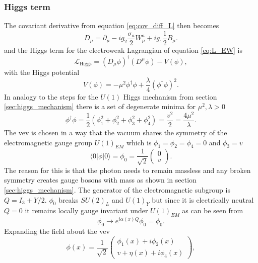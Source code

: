 \subsubsection*{Higgs term}
The covariant derivative from equation \ref{eq:cov_diff_L} then becomes
\begin{equation}
    D_\mu=\partial_\mu- i g_2\frac{{\sigma}_a}{2}W_\mu^a+ ig_1\frac{1}{2}B_\mu.
\end{equation}
and the Higgs term for the electroweak Lagrangian of equation \ref{eq:L_EW} is
\begin{equation}
    \mathcal{L}_\text{Higgs}= \left(D_\mu\phi\right)^\dagger (D^\mu\phi)-V(\phi),
    \label{eq:L_higgs}
\end{equation}
with the Higgs potential
\begin{equation}
    V(\phi) = -\mu^2\phi^\dagger\phi+\frac{\lambda}{4}\left(\phi^\dagger\phi\right)^2.
    \label{eq:Higgs_initial_potential}
\end{equation}
In analogy to the steps for the $U(1)$ Higgs mechanism from section \ref{sec:higgs_mechanism} there is a set of degenerate minima for $\mu^2,\lambda>0$
\begin{equation}
    \phi^\dagger\phi=\frac{1}{2}(\phi_1^2+\phi_2^2+\phi_3^2+\phi_4^2)=\frac{v^2}{2}=\frac{4\mu^2}{\lambda}.
    \label{eq:higgs_vev}
\end{equation}
The \ac{vev} is chosen in a way that the vacuum shares the symmetry of the electromagnetic gauge group $U(1)_{EM}$ which is \mbox{$\phi_1=\phi_2=\phi_4=0$} and $\phi_3=v$
\begin{equation}
    \langle0\vert \phi \vert0\rangle=\phi_0=\frac{1}{\sqrt{2}}
    \begin{pmatrix}
        0 \\
        v
    \end{pmatrix}.
\end{equation}
The reason for this is that the photon needs to remain massless and any broken symmetry creates gauge bosons with mass as shown in section \ref{sec:higgs_mechanism}. The generator of the electromagnetic subgroup is $Q=I_3+Y/2$. $\phi_0$ breaks $SU(2)_L$ and $U(1)_Y$ but since it is electrically neutral $Q=0$ it remains locally gauge invariant under $U(1)_{EM}$ as can be seen from
\begin{equation}
    \phi_0 \rightarrow e^{i\alpha(x)Q}\phi_0=\phi_0.
\end{equation}
Expanding the field about the \ac{vev}
\begin{equation}
    \phi(x)=\frac{1}{\sqrt{2}}
    \begin{pmatrix}
        \phi_1 (x)+i \phi_2 (x) \\
        v+ \eta(x)+i \phi_4 (x)
    \end{pmatrix},
\end{equation}
